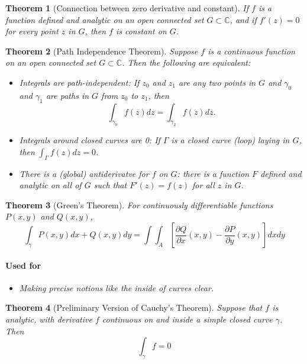 \documentclass[a4paper]{article}
\newtheorem{theorem}{Theorem}
\newcommand{\C}{\mathbb{C}}
\begin{document}
\begin{theorem}[Connection between zero derivative and constant]
If $f$ is a function defined and analytic on an open connected set $G \subset \C$, and if $f'(z) = 0$ for every point $z$ in $G$, then $f$ is constant on $G$. 
\end{theorem}


\begin{theorem}[Path Independence Theorem]
  Suppose $f$ is a continuous function on an open connected set $G \subset \C$.
  Then the following are equivalent: 
  \begin{itemize}
    \item Integrals are path-independent: If $z_0$ and $z_1$ are any two points in $G$ and $\gamma_0$ and $\gamma_1$ are paths in $G$ from $z_0$ to $z_1$, then 
      \[
        \int_{\gamma_0} f(z) dz = \int_{\gamma_2} f(z) dz.
      \]
    \item Integrals around closed curves are 0: If $\Gamma$ is a closed curve (loop) laying in $G$, then $\int_\Gamma f(z) dz = 0$.
    \item There is a (global) antiderivatve for $f$ on $G$: there is a function $F$ defined and analytic on all of $G$ such that $F'(z) = f(z)$ for all $z$ in $G$. 
  \end{itemize}
\end{theorem}

\begin{theorem}[Green's Theorem]
  For continuously differentiable functions \(P(x, y)\) and \(Q(x, y)\), 
  \[
    \int_\gamma P(x, y) dx + Q(x, y) dy = \int \int_A [\frac{\partial Q}{\partial x}(x, y) - \frac{\partial P}{\partial y}(x, y)] dx dy
    \]
  \paragraph{Used for}
    \begin{itemize}
      \item Making precise notions like the inside of curves clear. 
    \end{itemize}
\end{theorem}

\begin{theorem}[Preliminary Version of Cauchy's Theorem]
  Suppose that \(f\) is analytic, with derivative \(f\) continuous on and inside a simple closed curve \(\gamma\). 
  Then
  \[
    \int_\gamma f = 0
    \]
\end{theorem}
\end{document}
